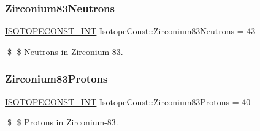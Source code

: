 \subsubsection{\texorpdfstring{Zirconium83\+Neutrons}{Zirconium83Neutrons}}
{\footnotesize\ttfamily \mbox{\hyperlink{group___isotope_const-_macros_ga5f18360b3e99483a35c32d789e62621c}{I\+S\+O\+T\+O\+P\+E\+C\+O\+N\+S\+T\+\_\+\+I\+NT}} Isotope\+Const\+::\+Zirconium83\+Neutrons = 43}

\$ \$ Neutrons in Zirconium-\/83. \mbox{\label{group___isotope_const-_zirconium-_zr83_gabcb619db07d40426dcb9554f4eeafcb9}} 
\subsubsection{\texorpdfstring{Zirconium83\+Protons}{Zirconium83Protons}}
{\footnotesize\ttfamily \mbox{\hyperlink{group___isotope_const-_macros_ga5f18360b3e99483a35c32d789e62621c}{I\+S\+O\+T\+O\+P\+E\+C\+O\+N\+S\+T\+\_\+\+I\+NT}} Isotope\+Const\+::\+Zirconium83\+Protons = 40}

\$ \$ Protons in Zirconium-\/83. 